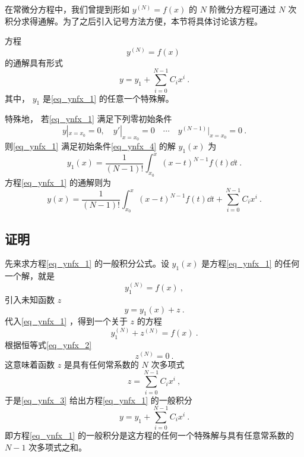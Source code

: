 
在常微分方程中，我们曾提到形如 $y^{(N)}=f(x)$ 的 $N$ 阶微分方程可通过 $N$ 次积分求得通解。为了之后引入记号方法方便，本节将具体讨论该方程。

方程
\begin{equation}\label{eq_ynfx_1}
y^{(N)}=f(x)~
\end{equation}
的通解具有形式
\begin{equation}\label{eq_ynfx_7}
y=y_1+\sum_{i=0}^{N-1}C_ix^i~.
\end{equation}
其中， $y_1$ 是\autoref{eq_ynfx_1} 的任意一个特殊解。

特殊地， 若\autoref{eq_ynfx_1} 满足下列零初始条件
\begin{equation}\label{eq_ynfx_4}
y|_{x=x_0}=0,\quad y'|_{x=x_0}=0\quad\cdots \quad y^{(N-1)}|_{x=x_0}=0~.
\end{equation}
则\autoref{eq_ynfx_1} 满足初始条件\autoref{eq_ynfx_4} 的解 $y_1(x)$ 为
\begin{equation}\label{eq_ynfx_5}
y_1(x)=\frac{1}{(N-1)!}\int_{x_0}^x(x-t)^{N-1}f(t)\dd t~.
\end{equation}
方程\autoref{eq_ynfx_1} 的通解则为
\begin{equation}
y(x)=\frac{1}{(N-1)!}\int_{x_0}^x(x-t)^{N-1}f(t)\dd t+\sum_{i=0}^{N-1}C_ix^i~.
\end{equation}
\subsection{证明}
先来求方程\autoref{eq_ynfx_1} 的一般积分公式。设 $y_1(x)$ 是方程\autoref{eq_ynfx_1} 的任何一个解，就是
\begin{equation}\label{eq_ynfx_2}
y_1^{(N)}=f(x)~,
\end{equation}
引入未知函数 $z$
\begin{equation}\label{eq_ynfx_3}
y=y_1(x)+z~.
\end{equation}
代入\autoref{eq_ynfx_1} ，得到一个关于 $z$ 的方程
\begin{equation}
y_1^{(N)}+z^{(N)}=f(x)~.
\end{equation}
根据恒等式\autoref{eq_ynfx_2} 
\begin{equation}
z^{(N)}=0~.
\end{equation}
这意味着函数 $z$ 是具有任何常系数的 $N$ 次多项式
\begin{equation}
z=\sum_{i=0}^{N-1}C_ix^i~,
\end{equation}
于是\autoref{eq_ynfx_3} 给出方程\autoref{eq_ynfx_1} 的一般积分
\begin{equation}
y=y_1+\sum_{i=0}^{N-1}C_ix^i~.
\end{equation}
即方程\autoref{eq_ynfx_1} 的一般积分是这方程的任何一个特殊解与具有任意常系数的 $N-1$ 次多项式之和。

